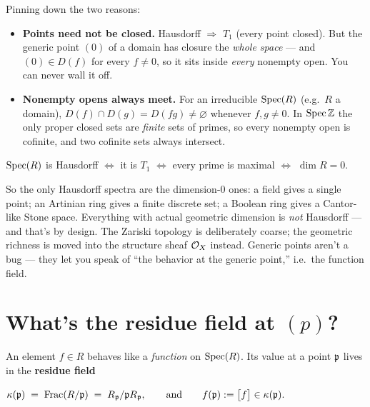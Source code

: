 Pinning down the two reasons:
\begin{itemize}[leftmargin=1.4em,itemsep=3pt]
  \item \textbf{Points need not be closed.} Hausdorff $\Rightarrow$ $T_1$ (every
  point closed). But the generic point $(0)$ of a domain has closure the
  \emph{whole space} --- and $(0)\in D(f)$ for every $f\neq0$, so it sits inside
  \emph{every} nonempty open. You can never wall it off.
  \item \textbf{Nonempty opens always meet.} For an irreducible $\operatorname{Spec}(R)$ (e.g.\ $R$
  a domain), $D(f)\cap D(g)=D(fg)\neq\varnothing$ whenever $f,g\neq0$. In $\operatorname{Spec}\mathbb{Z}$
  the only proper closed sets are \emph{finite} sets of primes, so every nonempty
  open is cofinite, and two cofinite sets always intersect.
\end{itemize}

\begin{primarybox}
\centering
$\operatorname{Spec}(R)$ is Hausdorff $\iff$ it is $T_1$ $\iff$ every prime is maximal
$\iff$ $\dim R = 0$.
\end{primarybox}

So the only Hausdorff spectra are the dimension-0 ones: a field gives a single
point; an Artinian ring gives a finite discrete set; a Boolean ring gives a
Cantor-like Stone space. Everything with actual geometric dimension is \emph{not}
Hausdorff --- and that's by design. The Zariski topology is deliberately coarse;
the geometric richness is moved into the structure sheaf $\mathcal{O}_X$ instead. Generic
points aren't a bug --- they let you speak of ``the behavior at the generic
point,'' i.e.\ the function field.

\section{What's the residue field at $(p)$?}\label{sec:zx-residue}

An element $f\in R$ behaves like a \emph{function} on $\operatorname{Spec}(R)$. Its value at a
point $\mathfrak{p}$ lives in the \textbf{residue field}

\begin{primarybox}
\centering
$\displaystyle \kappa(\mathfrak{p})\;=\;\operatorname{Frac}(R/\mathfrak{p})\;=\;R_{\mathfrak{p}}/\mathfrak{p} R_{\mathfrak{p}},
\qquad\text{and}\qquad f(\mathfrak{p}):=\big[f\big]\in\kappa(\mathfrak{p}).$
\end{primarybox}

